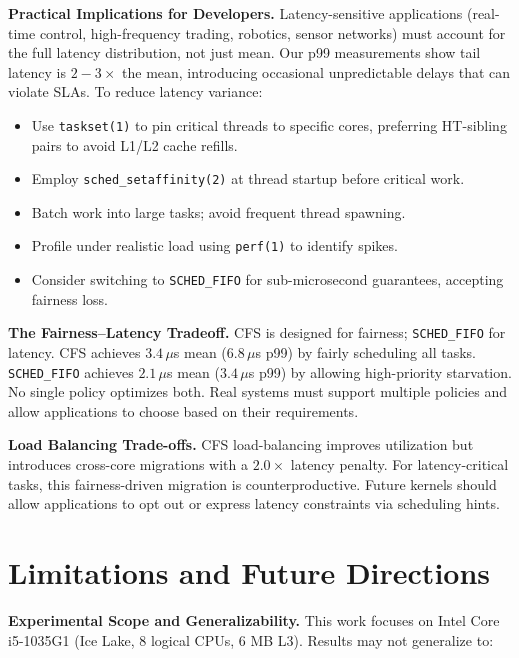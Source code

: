 \documentclass[conference]{IEEEtran}
\begin{document}
\textbf{Practical Implications for Developers.}  
Latency-sensitive applications (real-time control, high-frequency trading,
robotics, sensor networks) must account for the full latency distribution, not
just mean. Our p99 measurements show tail latency is $2-3\times$ the mean,
introducing occasional unpredictable delays that can violate SLAs. To reduce
latency variance:
\begin{itemize}
  \item Use \texttt{taskset(1)} to pin critical threads to specific cores,
        preferring HT-sibling pairs to avoid L1/L2 cache refills.
  \item Employ \texttt{sched\_setaffinity(2)} at thread startup before critical work.
  \item Batch work into large tasks; avoid frequent thread spawning.
  \item Profile under realistic load using \texttt{perf(1)} to identify spikes.
  \item Consider switching to \texttt{SCHED\_FIFO} for sub-microsecond guarantees,
        accepting fairness loss.
\end{itemize}

\textbf{The Fairness--Latency Tradeoff.}
CFS is designed for fairness; \texttt{SCHED\_FIFO} for latency. CFS achieves
$3.4\,\mu$s mean ($6.8\,\mu$s p99) by fairly scheduling all tasks. \texttt{SCHED\_FIFO}
achieves $2.1\,\mu$s mean ($3.4\,\mu$s p99) by allowing high-priority starvation.
No single policy optimizes both. Real systems must support multiple policies
and allow applications to choose based on their requirements.

\textbf{Load Balancing Trade-offs.}
CFS load-balancing improves utilization but introduces cross-core migrations
with a $2.0\times$ latency penalty. For latency-critical tasks, this fairness-driven
migration is counterproductive. Future kernels should allow applications to opt
out or express latency constraints via scheduling hints.

\section{Limitations and Future Directions}
\label{sec:limitations}

\textbf{Experimental Scope and Generalizability.}
This work focuses on Intel Core i5-1035G1 (Ice Lake, 8 logical CPUs, 6 MB L3).
Results may not generalize to:
\end{document}

